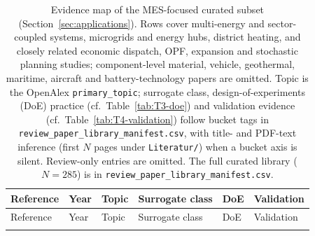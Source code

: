 \begin{longtable}{@{}p{} p{} p{} p{} p{} p{}@{}}
  \caption{Evidence map of the MES-focused curated subset
  (Section~\ref{sec:applications}). Rows cover multi-energy and sector-
  coupled systems, microgrids and energy hubs, district heating, and
  closely related economic dispatch, OPF, expansion and stochastic
  planning studies; component-level material, vehicle, geothermal,
  maritime, aircraft and battery-technology papers are omitted.
  Topic is the OpenAlex \texttt{primary\_topic}; surrogate class,
  design-of-experiments (DoE) practice (cf.\ Table~\ref{tab:T3-doe})
  and validation evidence (cf.\ Table~\ref{tab:T4-validation}) follow
  bucket tags in \texttt{review\_paper\_library\_manifest.csv}, with
  title- and PDF-text inference (first \(N\) pages under
  \texttt{Literatur/}) when a bucket axis is silent. Review-only
  entries are omitted. The full curated library (\(N=285\)) is in
  \texttt{review\_paper\_library\_manifest.csv}.}
  \label{tab:T6-evidence-map} \\
  \toprule
  Reference & Year & Topic & Surrogate class & DoE & Validation \\
  \midrule
  \endfirsthead

  \toprule
  Reference & Year & Topic & Surrogate class & DoE & Validation \\
  \midrule
  \endhead

  \bottomrule
  \endfoot


\end{longtable}
